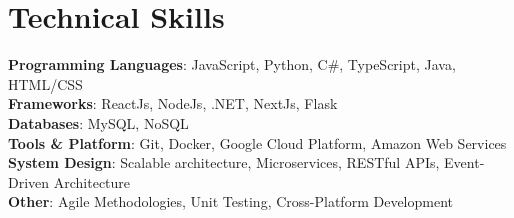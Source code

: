\documentclass[letterpaper,11pt]{article}
\begin{document}
%
\section{Technical Skills}
 \begin{itemize}[leftmargin=0.15in, label={}]
    \small{\item{
     \textbf{Programming Languages}{: JavaScript, Python, C\#, TypeScript, Java, HTML/CSS } \\
     \textbf{Frameworks}{: ReactJs, NodeJs, .NET, NextJs, Flask} \\
     \textbf{Databases}{: MySQL, NoSQL} \\
     \textbf{Tools \& Platform}{: Git, Docker, Google Cloud Platform, Amazon Web Services} \\
     \textbf{System Design}{: Scalable architecture, Microservices, RESTful APIs, Event-Driven Architecture} \\
     \textbf{Other}{: Agile Methodologies, Unit Testing, Cross-Platform Development} \\
    }}
 \end{itemize}


\end{document}
